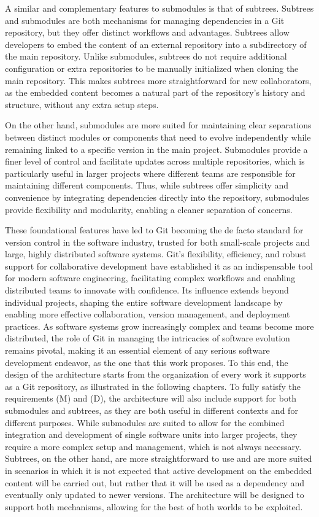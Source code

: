 A similar and complementary features to submodules is that of subtrees. Subtrees and submodules are both mechanisms for managing dependencies in a Git repository, but they offer distinct workflows and advantages. Subtrees allow developers to embed the content of an external repository into a subdirectory of the main repository. Unlike submodules, subtrees do not require additional configuration or extra repositories to be manually initialized when cloning the main repository. This makes subtrees more straightforward for new collaborators, as the embedded content becomes a natural part of the repository's history and structure, without any extra setup steps.

On the other hand, submodules are more suited for maintaining clear separations between distinct modules or components that need to evolve independently while remaining linked to a specific version in the main project. Submodules provide a finer level of control and facilitate updates across multiple repositories, which is particularly useful in larger projects where different teams are responsible for maintaining different components. Thus, while subtrees offer simplicity and convenience by integrating dependencies directly into the repository, submodules provide flexibility and modularity, enabling a cleaner separation of concerns.

These foundational features have led to Git becoming the de facto standard for version control in the software industry, trusted for both small-scale projects and large, highly distributed software systems. Git's flexibility, efficiency, and robust support for collaborative development have established it as an indispensable tool for modern software engineering, facilitating complex workflows and enabling distributed teams to innovate with confidence. Its influence extends beyond individual projects, shaping the entire software development landscape by enabling more effective collaboration, version management, and deployment practices. As software systems grow increasingly complex and teams become more distributed, the role of Git in managing the intricacies of software evolution remains pivotal, making it an essential element of any serious software development endeavor, as the one that this work proposes. To this end, the design of the architecture starts from the organization of every work it supports as a Git repository, as illustrated in the following chapters. To fully satisfy the requirements (M) and (D), the architecture will also include support for both submodules and subtrees, as they are both useful in different contexts and for different purposes. While submodules are suited to allow for the combined integration and development of single software units into larger projects, they require a more complex setup and management, which is not always necessary. Subtrees, on the other hand, are more straightforward to use and are more suited in scenarios in which it is not expected that active development on the embedded content will be carried out, but rather that it will be used as a dependency and eventually only updated to newer versions. The architecture will be designed to support both mechanisms, allowing for the best of both worlds to be exploited.

